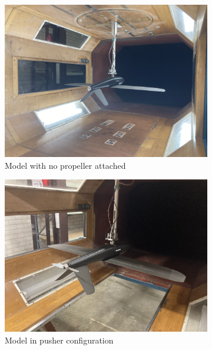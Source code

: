 \begin{figure}[H]
     \centering
     \begin{subfigure}[b]{0.3\textwidth}
         \centering
         \includegraphics[scale=0.05]{04_Methodology/Figs/noprop}
         \caption{Model with no propeller attached}
          \label{fig:noprop}
     \end{subfigure}
     \hfill
     \begin{subfigure}[b]{0.3\textwidth}
             \centering
             \includegraphics[scale = 0.05]{04_Methodology/Figs/pusher}
             \caption{Model in pusher configuration}
             \label{fig:pusher}
     \end{subfigure}
     \hfill
     \begin{subfigure}[b]{0.3\textwidth}

\end{subfigure}
\end{figure}
